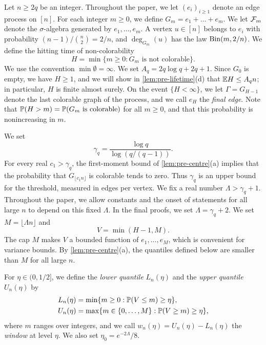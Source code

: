 Let $n \ge 2q$ be an integer. Throughout the paper, we let $(e_i)_{i \ge 1}$ denote an edge process on $[n]$. For each integer $m \ge 0$, we define $G_m = e_1 + \dots + e_m$. We let $\mathcal F_m$ denote the $\sigma$-algebra generated by $e_1, \dots, e_m$. A vertex $u \in [n]$ belongs to $e_i$ with probability $(n - 1)/\binom{n}{2} = 2/n$, and $\deg_{G_m}(u)$ has the law $\operatorname{Bin}(m, 2/n)$. We define the hitting time of non-colorability
\begin{equation}\label{eq:pre-H}
H = \min\{m \ge 0 : G_m \text{ is not colorable}\}.
\end{equation}
We use the convention $\min\emptyset = \infty$. We set $A_q = 2q \log q + 2q + 1$. Since $G_0$ is empty, we have $H \ge 1$, and we will show in \cref{lem:pre-lifetime}(d) that $\mathbb E H \le A_q n$; in particular, $H$ is finite almost surely. On the event $\{H < \infty\}$, we let $\Gamma = G_{H - 1}$ denote the last colorable graph of the process, and we call $e_H$ the \emph{final edge}. Note that $\mathbb P(H > m) = \mathbb P(G_m \text{ is colorable})$ for all $m \ge 0$, and that this probability is nonincreasing in $m$.

We set
\begin{equation}\label{eq:pre-gamma}
\gamma_q = \frac{\log q}{\log(q/(q - 1))}.
\end{equation}
For every real $c_1 > \gamma_q$, the first-moment bound of \cref{lem:pre-centre}(a) implies that the probability that $G_{\lfloor c_1 n\rfloor}$ is colorable tends to zero. Thus $\gamma_q$ is an upper bound for the threshold, measured in edges per vertex. We fix a real number $\Lambda > \gamma_q + 1$. Throughout the paper, we allow constants and the onset of statements for all large $n$ to depend on this fixed $\Lambda$. In the final proofs, we set $\Lambda = \gamma_q + 2$. We set $M = \lfloor \Lambda n \rfloor$ and
\begin{equation}\label{eq:pre-V}
V = \min(H - 1, M).
\end{equation}
The cap $M$ makes $V$ a bounded function of $e_1, \dots, e_M$, which is convenient for variance bounds. By \cref{lem:pre-centre}(a), the quantiles defined below are smaller than $M$ for all large $n$.

\begin{definition}\label{def:pre-quantile}
For $\eta \in (0, 1/2]$, we define the \emph{lower quantile} $L_n(\eta)$ and the \emph{upper quantile} $U_n(\eta)$ by
\begin{equation}\label{eq:pre-quantile}
\begin{aligned}
L_n(\eta) &= \min\{m \ge 0 : \mathbb P(V \le m) \ge \eta\}, \\
U_n(\eta) &= \max\{m \in \{0, \dots, M\} : \mathbb P(V \ge m) \ge \eta\},
\end{aligned}
\end{equation}
where $m$ ranges over integers, and we call $w_n(\eta) = U_n(\eta) - L_n(\eta)$ the \emph{window} at level $\eta$. We also set $\eta_0 = e^{-2\Lambda}/8$.
\end{definition}

